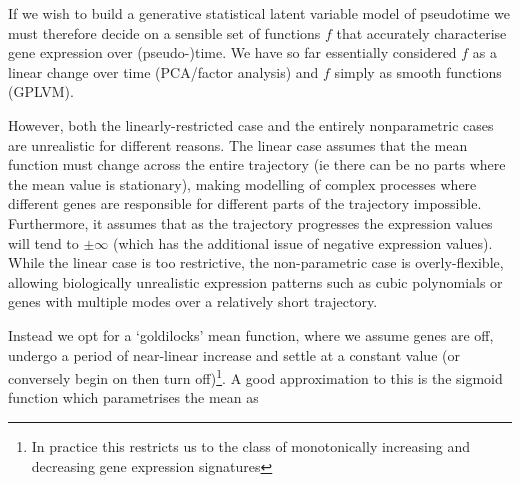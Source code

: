
If we wish to build a generative statistical latent variable model of pseudotime we must therefore decide on a sensible set of functions $f$ that accurately characterise gene expression over (pseudo-)time. We have so far essentially considered $f$ as a linear change over time (PCA/factor analysis) and $f$ simply as smooth functions (GPLVM).

However, both the linearly-restricted case and the entirely nonparametric cases are unrealistic for different reasons. The linear case assumes that the mean function must change across the entire trajectory (ie there can be no parts where the mean value is stationary), making modelling of complex processes where different genes are responsible for different parts of the trajectory impossible. Furthermore, it assumes that as the trajectory progresses the expression values will tend to $\pm \infty$ (which has the additional issue of negative expression values). While the linear case is too restrictive, the non-parametric case is overly-flexible, allowing biologically unrealistic expression patterns such as cubic polynomials or genes with multiple modes over a relatively short trajectory.

Instead we opt for a `goldilocks' mean function, where we assume genes are off, undergo a period of near-linear increase and settle at a constant value (or conversely begin on then turn off)\footnote{In practice this restricts us to the class of monotonically increasing and decreasing gene expression signatures}. A good approximation to this is the sigmoid function which parametrises the mean as

